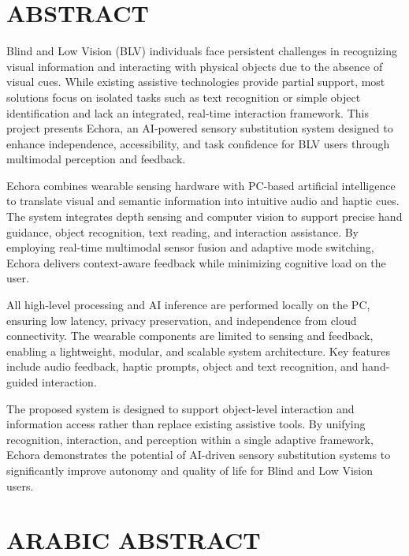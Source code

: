 \chapter*{ABSTRACT}
\thispagestyle{plain}

\vspace{0.5cm}

Blind and Low Vision (BLV) individuals face persistent challenges in recognizing visual information and interacting with physical objects due to the absence of visual cues. While existing assistive technologies provide partial support, most solutions focus on isolated tasks such as text recognition or simple object identification and lack an integrated, real-time interaction framework. This project presents Echora, an AI-powered sensory substitution system designed to enhance independence, accessibility, and task confidence for BLV users through multimodal perception and feedback.


Echora combines wearable sensing hardware with PC-based artificial intelligence to translate visual and semantic information into intuitive audio and haptic cues. The system integrates depth sensing and computer vision to support precise hand guidance, object recognition, text reading, and interaction assistance. By employing real-time multimodal sensor fusion and adaptive mode switching, Echora delivers context-aware feedback while minimizing cognitive load on the user.

All high-level processing and AI inference are performed locally on the PC, ensuring low latency, privacy preservation, and independence from cloud connectivity. The wearable components are limited to sensing and feedback, enabling a lightweight, modular, and scalable system architecture. Key features include audio feedback, haptic prompts, object and text recognition, and hand-guided interaction.

The proposed system is designed to support object-level interaction and information access rather than replace existing assistive tools. By unifying recognition, interaction, and perception within a single adaptive framework, Echora demonstrates the potential of AI-driven sensory substitution systems to significantly improve autonomy and quality of life for Blind and Low Vision users.
\clearpage
\ifPDFTeX
\chapter*{ARABIC ABSTRACT}
\thispagestyle{plain}

\vspace{0.5cm}

